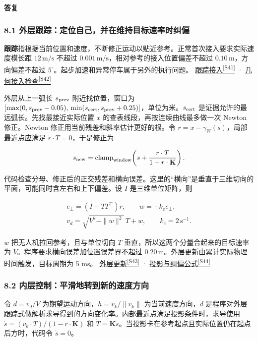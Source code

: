 \documentclass[11pt,a4paper]{article}
\numberwithin{equation}{topic}
\newenvironment{reply}{%
  \par\noindent\textcolor{replycolor}{\sffamily\bfseries 答复}\par\nobreak\ignorespaces
}{\par\medskip}
\newcommand{\sourceref}[2]{\hyperlink{source-#1}{#2\textsuperscript{[#1]}}}
\begin{document}
\begin{reply}
\subsubsection*{8.1 外层跟踪：定位自己，并在维持目标速率时纠偏}

\textbf{跟踪}指根据当前位置和速度，不断修正运动以贴近参考。正常首次接入要求实际速度模长距 \(12\,\mathrm{m/s}\) 不超过 \(0.001\,\mathrm{m/s}\)，相对参考的接入位置偏差不超过 \(0.10\,\mathrm m\)，方向偏差不超过 \(5^\circ\)。起步加速和异常停车属于另外的执行问题。 \sourceref{S41}{跟踪接入} · \sourceref{S42}{几何接入检查}

外层从上一弧长 \(s_{\rm prev}\) 附近找位置，窗口为 \([\max(0,s_{\rm prev}-0.05),\,\min(s_{\rm cert},s_{\rm prev}+0.25)]\)，单位为米。\(s_{\rm cert}\) 是证据允许的最远弧长。先找最接近实际位置 \(x\) 的查表线段，再按连续曲线最多做一次 Newton 修正。Newton 修正用当前残差和斜率估计更好的根。令 \(r=x-\gamma_W(s)\)，局部最近点应满足 \(r\cdot T=0\)，于是修正为

\begin{equation}
\label{eq:projection}
s_{\rm new}=\operatorname{clamp}_{\rm window}\!
\left(s+\frac{r\cdot T}{1-r\cdot\mathbf K}\right).
\end{equation}

代码检查分母、修正后的正交残差和横向误差。这里的“横向”是垂直于三维切向的平面，可能同时含左右和上下偏差。设 \(I\) 是三维单位矩阵，则

\begin{equation}
\label{eq:cross-track}
\begin{gathered}
e_\perp=(I-TT^\top)r,\qquad
w=-k_e e_\perp,\\
v_d=\sqrt{V^2-\|w\|^2}\,T+w,\qquad
k_e=2\,\mathrm{s^{-1}}.
\end{gathered}
\end{equation}

\(w\) 把无人机拉回参考，且与单位切向 \(T\) 垂直，所以这两个分量合起来的目标速率为 \(V\)。程序要求横向误差加位置误差界不超过 \(0.20\,\mathrm m\)。外层更新由累计实际物理时间触发，目标周期为 5 ms。 \sourceref{S43}{外层更新} · \sourceref{S44}{投影与纠偏公式}

\subsubsection*{8.2 内层控制：平滑地转到新的速度方向}

令 \(d=v_d/V\) 为期望运动方向，\(h=v_k/\|v_k\|\) 为当前速度方向，\(\dot d\) 是程序对外层跟踪式做解析求导得到的方向变化率。内部最近点满足投影条件时，求导使用 \(\dot s=(v_k\cdot T)/(1-r\cdot\mathbf K)\) 和 \(\dot T=\mathbf K\dot s\)。当投影卡在参考起点且实际位置仍在起点后方时，代码令 \(\dot s=0\)。


\end{reply}
\end{document}
